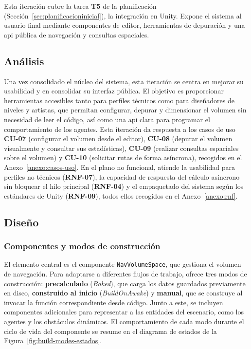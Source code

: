 Esta iteración cubre la tarea \textbf{T5} de la planificación (Sección~\ref{sec:planificacioninicial}), la integración en Unity.
Expone el sistema al usuario final mediante componentes de editor, herramientas de depuración y una \acrshort{api} pública de navegación y consultas espaciales.

\subsection{Análisis}

Una vez consolidado el núcleo del sistema, esta iteración se centra en mejorar su usabilidad y en consolidar su interfaz pública.
El objetivo es proporcionar herramientas accesibles tanto para perfiles técnicos como para diseñadores de niveles y artistas, que permitan configurar, depurar y dimensionar el volumen sin necesidad de leer el código, así como una \acrshort{api} clara para programar el comportamiento de los agentes.
Esta iteración da respuesta a los casos de uso \textbf{CU-07} (configurar el volumen desde el editor), \textbf{CU-08} (depurar el volumen visualmente y consultar sus estadísticas), \textbf{CU-09} (realizar consultas espaciales sobre el volumen) y \textbf{CU-10} (solicitar rutas de forma asíncrona), recogidos en el Anexo~\ref{anexo:casos-uso}.
En el plano no funcional, atiende la usabilidad para perfiles no técnicos (\textbf{RNF-07}), la capacidad de respuesta del cálculo asíncrono sin bloquear el hilo principal (\textbf{RNF-04}) y el empaquetado del sistema según los estándares de Unity (\textbf{RNF-09}), todos ellos recogidos en el Anexo~\ref{anexo:rnf}.

\subsection{Diseño}

\subsubsection{Componentes y modos de construcción}

El elemento central es el componente \texttt{NavVolumeSpace}, que gestiona el volumen de navegación.
Para adaptarse a diferentes flujos de trabajo, ofrece tres modos de construcción: \textbf{precalculado} (\textit{Baked}), que carga los datos guardados previamente en disco, \textbf{construido al inicio} (\textit{BuildOnAwake}) y \textbf{manual}, que se construye al invocar la función correspondiente desde código.
Junto a este, se incluyen componentes adicionales para representar a las entidades del escenario, como los agentes y los obstáculos dinámicos.
El comportamiento de cada modo durante el ciclo de vida del componente se resume en el diagrama de estados de la Figura~\ref{fig:build-modes-estados}.

